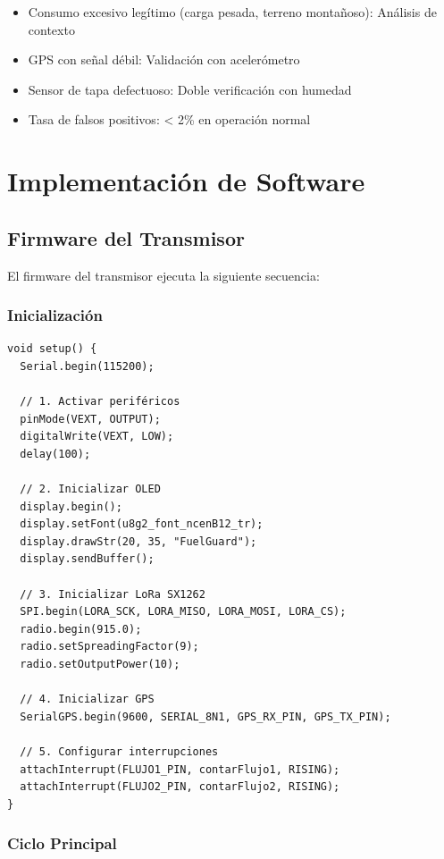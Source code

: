 \documentclass[12pt,a4paper,oneside]{report}
\begin{document}
\begin{itemize}
    \item Consumo excesivo legítimo (carga pesada, terreno montañoso): Análisis de contexto
    \item GPS con señal débil: Validación con acelerómetro
    \item Sensor de tapa defectuoso: Doble verificación con humedad
    \item Tasa de falsos positivos: < 2\% en operación normal
\end{itemize}

\chapter{Implementación de Software}

\section{Firmware del Transmisor}

El firmware del transmisor ejecuta la siguiente secuencia:

\subsection{Inicialización}

\begin{lstlisting}
void setup() {
  Serial.begin(115200);
  
  // 1. Activar periféricos
  pinMode(VEXT, OUTPUT);
  digitalWrite(VEXT, LOW);
  delay(100);
  
  // 2. Inicializar OLED
  display.begin();
  display.setFont(u8g2_font_ncenB12_tr);
  display.drawStr(20, 35, "FuelGuard");
  display.sendBuffer();
  
  // 3. Inicializar LoRa SX1262
  SPI.begin(LORA_SCK, LORA_MISO, LORA_MOSI, LORA_CS);
  radio.begin(915.0);
  radio.setSpreadingFactor(9);
  radio.setOutputPower(10);
  
  // 4. Inicializar GPS
  SerialGPS.begin(9600, SERIAL_8N1, GPS_RX_PIN, GPS_TX_PIN);
  
  // 5. Configurar interrupciones
  attachInterrupt(FLUJO1_PIN, contarFlujo1, RISING);
  attachInterrupt(FLUJO2_PIN, contarFlujo2, RISING);
}
\end{lstlisting}

\subsection{Ciclo Principal}
\end{document}
